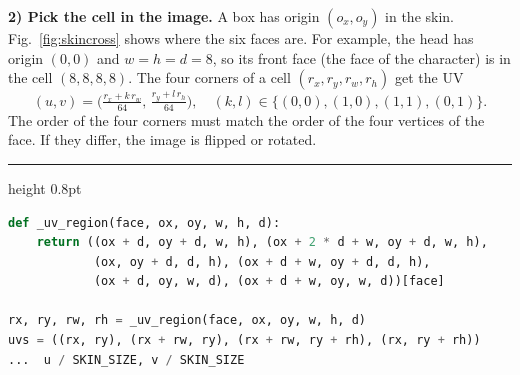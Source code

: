\documentclass[9pt,twocolumn,a4paper]{extarticle}
\newenvironment{codebox}{\par\vspace{5pt}\noindent\begin{minipage}{\columnwidth}\hrule height 0.8pt\vspace{2pt}}{\end{minipage}\par\vspace{5pt}\noindent\ignorespaces}
\newcommand{\code}[1]{\texttt{#1}}
\begin{document}
\textbf{2) Pick the cell in the image.} A box has origin $(o_x,o_y)$ in the skin. Fig.~\ref{fig:skincross} shows where the six faces are. For example, the head has origin $(0,0)$ and $w=h=d=8$, so its front face (the face of the character) is in the cell $(8,8,8,8)$. The four corners of a cell $(r_x,r_y,r_w,r_h)$ get the UV
\begin{equation}
(u,v)=\Big(\tfrac{r_x+k\,r_w}{64},\,\tfrac{r_y+l\,r_h}{64}\Big),\quad (k,l)\in\{(0,0),(1,0),(1,1),(0,1)\}.
\label{eq:skin-uv}
\end{equation}
The order of the four corners must match the order of the four vertices of the face. If they differ, the image is flipped or rotated.

\begin{codebox}
\begin{lstlisting}[language=Python,caption={\code{render/avatar\_renderer.py}: skin cell and UV of a face},label={lst:skinuv}]
def _uv_region(face, ox, oy, w, h, d):
    return ((ox + d, oy + d, w, h), (ox + 2 * d + w, oy + d, w, h),
            (ox, oy + d, d, h), (ox + d + w, oy + d, d, h),
            (ox + d, oy, w, d), (ox + d + w, oy, w, d))[face]

rx, ry, rw, rh = _uv_region(face, ox, oy, w, h, d)
uvs = ((rx, ry), (rx + rw, ry), (rx + rw, ry + rh), (rx, ry + rh))
...  u / SKIN_SIZE, v / SKIN_SIZE
\end{lstlisting}
\end{codebox}
\end{document}

